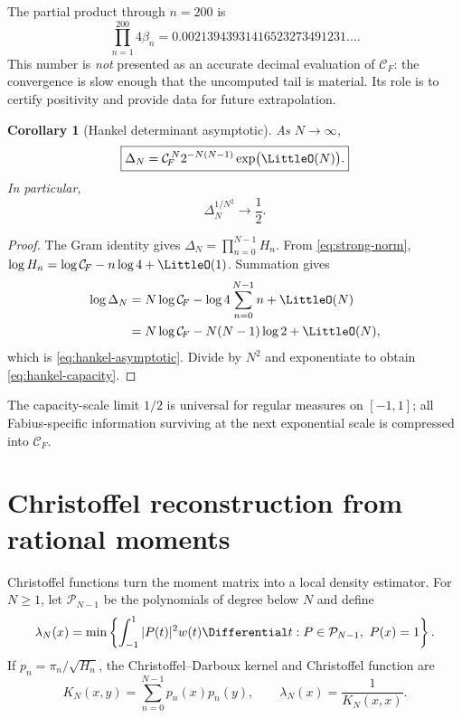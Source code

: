 \documentclass[11pt,oneside]{article}
\newtheorem{corollary}[theorem]{Corollary}
\theoremstyle{definition}
\theoremstyle{remark}
\numberwithin{equation}{section}
\begin{document}
The partial product through $n=200$ is
\begin{equation}
 \prod_{n=1}^{200}4\beta_n
 =0.00213943931416523273491231\ldots.
 \label{eq:szego-partial-200}
\end{equation}
This number is \emph{not} presented as an accurate decimal evaluation of
$\mathcal C_{\!F}$: the convergence is slow enough that the uncomputed tail is
material.  Its role is to certify positivity and provide data for future
extrapolation.

\begin{corollary}[Hankel determinant asymptotic]
\label{cor:hankel-asymptotic}
As $N\to\infty$,
\begin{equation}
 \boxed{
 \Delta_N=\mathcal C_{\!F}^{\,N}
          2^{-N(N-1)}\exp\bigl(\LittleO(N)\bigr).}
 \label{eq:hankel-asymptotic}
\end{equation}
In particular,
\begin{equation}
 \Delta_N^{1/N^2}\longrightarrow\frac12.
 \label{eq:hankel-capacity}
\end{equation}
\end{corollary}

\begin{proof}
The Gram identity gives $\Delta_N=\prod_{n=0}^{N-1}H_n$.  From
\cref{eq:strong-norm},
$\log H_n=\log\mathcal C_{\!F}-n\log4+\LittleO(1)$.  Summation gives
\begin{align*}
 \log\Delta_N
 &=N\log\mathcal C_{\!F}
   -\log4\sum_{n=0}^{N-1}n+\LittleO(N)\\
 &=N\log\mathcal C_{\!F}-N(N-1)\log2+\LittleO(N),
\end{align*}
which is \cref{eq:hankel-asymptotic}.  Divide by $N^2$ and exponentiate to
obtain \cref{eq:hankel-capacity}.
\end{proof}

The capacity-scale limit $1/2$ is universal for regular measures on
$[-1,1]$; all Fabius-specific information surviving at the next exponential
scale is compressed into $\mathcal C_{\!F}$.

\section{Christoffel reconstruction from rational moments}
\label{sec:christoffel}

Christoffel functions turn the moment matrix into a local density estimator.
For $N\ge1$, let $\mathcal P_{N-1}$ be the polynomials of degree below $N$
and define
\begin{equation}
 \lambda_N(x)
 =\min\left\{
   \int_{-1}^{1}|P(t)|^2w(t)\Differential t:
   P\in\mathcal P_{N-1},\ P(x)=1
 \right\}.
 \label{eq:christoffel-variational}
\end{equation}
If $p_n=\pi_n/\sqrt{H_n}$, the Christoffel--Darboux kernel and Christoffel
function are
\begin{equation}
 K_N(x,y)=\sum_{n=0}^{N-1}p_n(x)p_n(y),
 \qquad
 \lambda_N(x)=\frac1{K_N(x,x)}.
 \label{eq:christoffel-kernel}
\end{equation}
\end{document}
